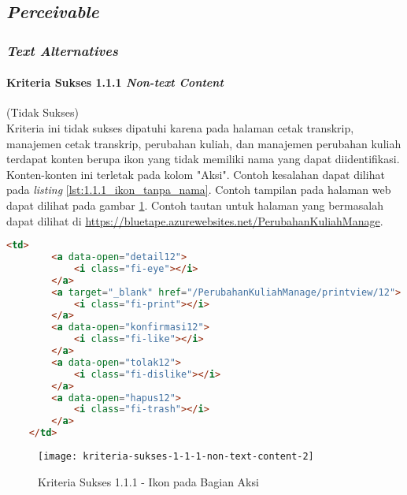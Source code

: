 \subsection{\textit{Perceivable}}
\label{subsec:kepatuhan_bluetape_perceivable}

\subsubsection{\textit{Text Alternatives}}
\label{subsubsec:kepatuhan_bluetape_text_alternatives}

\paragraph{Kriteria Sukses 1.1.1 \textit{Non-text Content}}
\label{par:kepatuhan_bluetape_kriteria_sukses_1.1.1}
(Tidak Sukses)\\

Kriteria ini tidak sukses dipatuhi karena pada halaman cetak transkrip, manajemen cetak transkrip, perubahan kuliah, dan manajemen perubahan kuliah terdapat konten berupa ikon yang tidak memiliki nama yang dapat diidentifikasi. Konten-konten ini terletak pada kolom "Aksi". Contoh kesalahan dapat dilihat pada \textit{listing} \ref{lst:1.1.1_ikon_tanpa_nama}. Contoh tampilan pada halaman web dapat dilihat pada gambar \ref{fig:1.1.1_non_text_content_2}. Contoh tautan untuk halaman yang bermasalah dapat dilihat di \url{https://bluetape.azurewebsites.net/PerubahanKuliahManage}.
\begin{lstlisting}[frame=single, label={lst:1.1.1_ikon_tanpa_nama}, language=HTML, caption=Kriteria Sukses 1.1.1 - Ikon Tanpa Nama]
    <td>
        <a data-open="detail12">
            <i class="fi-eye"></i>
        </a>
        <a target="_blank" href="/PerubahanKuliahManage/printview/12">
            <i class="fi-print"></i>
        </a>
        <a data-open="konfirmasi12">
            <i class="fi-like"></i>
        </a>  
        <a data-open="tolak12">
            <i class="fi-dislike"></i>
        </a>
        <a data-open="hapus12">
            <i class="fi-trash"></i>
        </a>
    </td>
\end{lstlisting}

\begin{figure}[H]
    \centering  
    \texttt{[image: kriteria-sukses-1-1-1-non-text-content-2]}  
    \caption[Kriteria Sukses 1.1.1 - Ikon pada Bagian Aksi]{Kriteria Sukses 1.1.1 - Ikon pada Bagian Aksi}
    \label{fig:1.1.1_non_text_content_2}  
\end{figure} 

